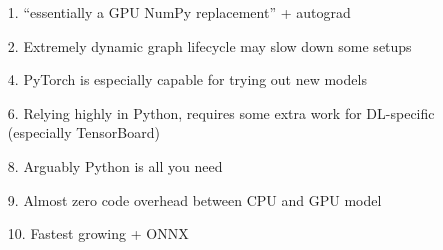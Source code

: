 \documentclass[hyperref={pdfpagelabels=false}]{beamer}
\begin{document}
\begin{frame}
\begin{columns}[t]
\begin{tikzpicture}
         \end{tikzpicture}
         \begin{itemize}
         \item[\scriptsize{\textcolor{visiblered}{1.}}] \scriptsize{``essentially a GPU NumPy replacement''\cite{pytorch-vs-tf} + autograd}
         \item[\scriptsize{\textcolor{visiblegreen}{2.}}] \scriptsize{Extremely dynamic graph lifecycle may slow down some setups}
         \item[\scriptsize{\textcolor{visiblegreen}{4.}}] \scriptsize{PyTorch is especially capable for trying out new models}
         \item[\scriptsize{\textcolor{visiblegreen}{6.}}] \scriptsize{Relying highly in Python, requires some extra work for DL-specific (especially TensorBoard)}
         \item[\scriptsize{\textcolor{visibleblue}{8.}}] \scriptsize{Arguably Python is all you need}
         \item[\scriptsize{\textcolor{visibleblue}{9.}}] \scriptsize{Almost zero code overhead between CPU and GPU model}
         \item[\scriptsize{\textcolor{visibleblue}{10.}}] \scriptsize{Fastest growing + ONNX}
         \end{itemize}
          \end{columns}
          
     \end{frame}
\end{document}
